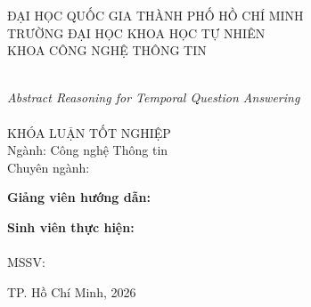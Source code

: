 \begin{titlepage}
\begin{center}

{\large ĐẠI HỌC QUỐC GIA THÀNH PHỐ HỒ CHÍ MINH}\\[2mm]
{\large TRƯỜNG ĐẠI HỌC KHOA HỌC TỰ NHIÊN}\\[2mm]
{\large KHOA CÔNG NGHỆ THÔNG TIN}\\[10mm]


\HRule\\[6mm]
{\LARGE\bfseries \tenKL\par}
\vspace{3mm}
{\large\itshape Abstract Reasoning for Temporal Question Answering}\\[6mm]
\HRule\\[14mm]

{\large KHÓA LUẬN TỐT NGHIỆP}\\[2mm]
{\large Ngành: Công nghệ Thông tin}\\[2mm]
{\large Chuyên ngành: \tenBM}\\[18mm]

\begin{minipage}{0.45\textwidth}
\begin{flushleft}
\textbf{Giảng viên hướng dẫn:}\\
\tenGVHD
\end{flushleft}
\end{minipage}
\hfill
\begin{minipage}{0.45\textwidth}
\begin{flushright}
\textbf{Sinh viên thực hiện:}\\
\tenSV\\
MSSV: \mssv
\end{flushright}
\end{minipage}

\vfill
{\large TP. Hồ Chí Minh, 2026}

\end{center}
\end{titlepage}
